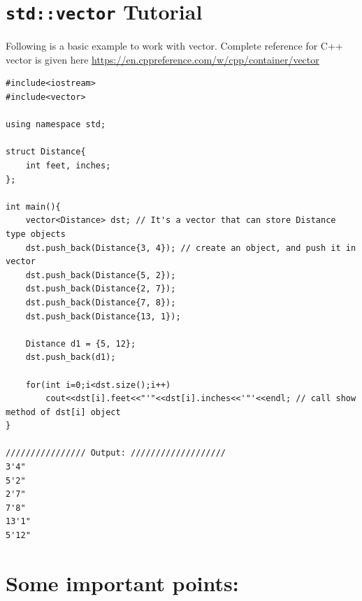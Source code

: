 \documentclass[a4paper,12pt]{article}
\begin{document}
	\section{\texttt{std::vector} Tutorial} \label{vectorTutorial}
	
	Following is a basic example to work with vector. Complete reference for C++ vector is given here \url{https://en.cppreference.com/w/cpp/container/vector}
	\begin{lstlisting}
#include<iostream>
#include<vector>

using namespace std;

struct Distance{
	int feet, inches;
};

int main(){
	vector<Distance> dst; // It's a vector that can store Distance type objects
	dst.push_back(Distance{3, 4}); // create an object, and push it in vector
	dst.push_back(Distance{5, 2});
	dst.push_back(Distance{2, 7});
	dst.push_back(Distance{7, 8});
	dst.push_back(Distance{13, 1});

    Distance d1 = {5, 12}; 
    dst.push_back(d1);
	
	for(int i=0;i<dst.size();i++)
		cout<<dst[i].feet<<"'"<<dst[i].inches<<'"'<<endl; // call show method of dst[i] object
}

//////////////// Output: ///////////////////
3'4"
5'2"
2'7"
7'8"
13'1"
5'12"
	\end{lstlisting}
	
	\section{Some important points:} 
	
\end{document}
